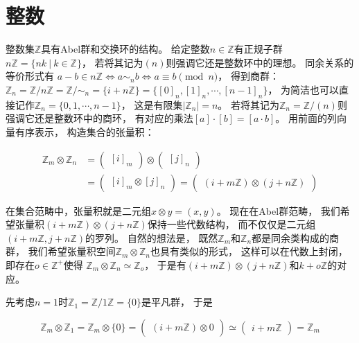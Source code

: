 \documentclass[10pt, openany]{book}
\begin{document}
\section{整数}

整数集$\mathbb Z$具有Abel群和交换环的结构。
给定整数$n \in \mathbb Z$有正规子群$n\mathbb Z = \{nk \ | \ k\in \mathbb Z\}$，
若将其记为$(n)$则强调它还是整数环中的理想。
同余关系的等价形式有 $a - b \in n\mathbb Z \Leftrightarrow a \sim_n b \Leftrightarrow a \equiv b \pmod n$，
得到商群：
$\mathbb Z_n = \mathbb Z/n\mathbb Z = \mathbb Z/\sim_n = \{ i + n\mathbb Z\} = \{[0]_n,[1]_n,\cdots,[n-1]_n\}$，
为简洁也可以直接记作$\mathbb Z_n = \{0,1,\cdots,n-1\}$，
这是有限集$|\mathbb Z_n| = n$。
若将其记为$\mathbb Z_n = \mathbb Z/(n)$则强调它还是整数环中的商环，
有对应的乘法$[a] \cdot [b] = [a \cdot b]$。
用前面的列向量有序表示，
构造集合的张量积：

$$
\begin{aligned}
\mathbb Z_m \otimes \mathbb Z_n 
&=\begin{pmatrix}[i]_m\end{pmatrix}
\otimes \begin{pmatrix}[j]_n\end{pmatrix} \\
&=\begin{pmatrix}[i]_m \otimes [j]_n\end{pmatrix}
=\begin{pmatrix}(i + m\mathbb Z) \otimes (j + n\mathbb Z)\end{pmatrix}
\end{aligned}
$$

在集合范畴中，张量积就是二元组$x \otimes y = (x,y)$。
现在在Abel群范畴，
我们希望张量积$(i + m\mathbb Z) \otimes (j + n\mathbb Z)$保持一些代数结构，
而不仅仅是二元组$(i + m\mathbb Z,j + n\mathbb Z)$的罗列。
自然的想法是，
既然$\mathbb Z_m$和$\mathbb Z_n$都是同余类构成的商群，
我们希望张量积空间$\mathbb Z_m \otimes \mathbb Z_n$也具有类似的形式，
这样可以在代数上封闭，
即存在$o\in\mathbb Z^+$使得
$\mathbb Z_m \otimes \mathbb Z_n \simeq \mathbb Z_o$，
于是有$(i + m\mathbb Z) \otimes (j + n\mathbb Z)$和$k + o\mathbb Z$的对应。

先考虑$n=1$时$\mathbb Z_1 = \mathbb Z/1\mathbb Z = \{0\}$是平凡群，
于是

$$
\mathbb Z_m \otimes \mathbb Z_1 = \mathbb Z_m \otimes \{0\}
= \begin{pmatrix}(i + m\mathbb Z) \otimes 0 \end{pmatrix}
\simeq \begin{pmatrix}i + m\mathbb Z\end{pmatrix}
= \mathbb Z_m
$$
\end{document}
